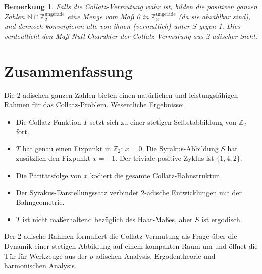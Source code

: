 \documentclass[12pt,a4paper]{article}
\newtheorem{remark}[theorem]{Bemerkung}
\begin{document}
\begin{remark}\label{rem:vermutung_mass}
Falls die Collatz-Vermutung wahr ist, bilden die positiven ganzen Zahlen
$\mathbb{N} \cap \mathbb{Z}_2^{\text{ungerade}}$ eine Menge vom Maß 0 in
$\mathbb{Z}_2^{\text{ungerade}}$ (da sie abzählbar sind), und dennoch konvergieren
\emph{alle} von ihnen (vermutlich) unter $S$ gegen 1. Dies verdeutlicht den
Maß-Null-Charakter der Collatz-Vermutung aus 2-adischer Sicht.
\end{remark}

\section{Zusammenfassung}

Die 2-adischen ganzen Zahlen bieten einen natürlichen und leistungsfähigen Rahmen für
das Collatz-Problem. Wesentliche Ergebnisse:
\begin{itemize}
  \item Die Collatz-Funktion $T$ setzt sich zu einer stetigen Selbstabbildung von
        $\mathbb{Z}_2$ fort.
  \item $T$ hat genau einen Fixpunkt in $\mathbb{Z}_2$: $x=0$. Die Syrakus-Abbildung $S$ hat zusätzlich den Fixpunkt $x=-1$. Der triviale positive Zyklus ist $\{1, 4, 2\}$.
  \item Die Paritätsfolge von $x$ kodiert die gesamte Collatz-Bahnstruktur.
  \item Der Syrakus-Darstellungssatz verbindet 2-adische Entwicklungen mit der Bahngeometrie.
  \item $T$ ist nicht maßerhaltend bezüglich des Haar-Maßes, aber $S$ ist ergodisch.
\end{itemize}
Der 2-adische Rahmen formuliert die Collatz-Vermutung als Frage über die Dynamik einer
stetigen Abbildung auf einem kompakten Raum um und öffnet die Tür für Werkzeuge aus
der $p$-adischen Analysis, Ergodentheorie und harmonischen Analysis.
\end{document}
